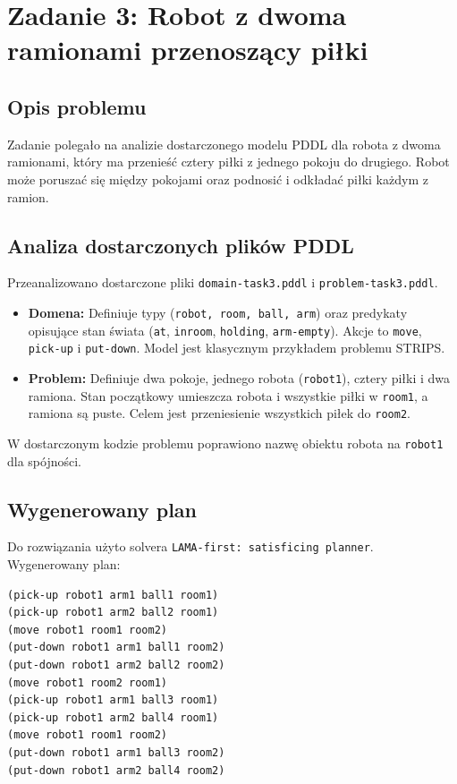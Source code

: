 \documentclass[11pt,a4paper]{article}
\begin{document}
\section{Zadanie 3: Robot z dwoma ramionami przenoszący piłki}
\subsection{Opis problemu}
Zadanie polegało na analizie dostarczonego modelu PDDL dla robota z dwoma ramionami, który ma przenieść cztery piłki z jednego pokoju do drugiego. Robot może poruszać się między pokojami oraz podnosić i odkładać piłki każdym z ramion.

\subsection{Analiza dostarczonych plików PDDL}
Przeanalizowano dostarczone pliki \texttt{domain-task3.pddl} i \texttt{problem-task3.pddl}.
\begin{itemize}
  \item \textbf{Domena:} Definiuje typy (\texttt{robot, room, ball, arm}) oraz predykaty opisujące stan świata (\texttt{at}, \texttt{inroom}, \texttt{holding}, \texttt{arm-empty}). Akcje to \texttt{move}, \texttt{pick-up} i \texttt{put-down}. Model jest klasycznym przykładem problemu STRIPS.
  \item \textbf{Problem:} Definiuje dwa pokoje, jednego robota (\texttt{robot1}), cztery piłki i dwa ramiona. Stan początkowy umieszcza robota i wszystkie piłki w \texttt{room1}, a ramiona są puste. Celem jest przeniesienie wszystkich piłek do \texttt{room2}.
\end{itemize}
W dostarczonym kodzie problemu poprawiono nazwę obiektu robota na \texttt{robot1} dla spójności.

\subsection{Wygenerowany plan}
Do rozwiązania użyto solvera \texttt{LAMA-first: satisficing planner}. Wygenerowany plan:
\begin{lstlisting}[caption=Wygenerowany plan dla Zadania 3, label=lst:plan_task3]
(pick-up robot1 arm1 ball1 room1)
(pick-up robot1 arm2 ball2 room1)
(move robot1 room1 room2)
(put-down robot1 arm1 ball1 room2)
(put-down robot1 arm2 ball2 room2)
(move robot1 room2 room1)
(pick-up robot1 arm1 ball3 room1)
(pick-up robot1 arm2 ball4 room1)
(move robot1 room1 room2)
(put-down robot1 arm1 ball3 room2)
(put-down robot1 arm2 ball4 room2)
\end{lstlisting}
\end{document}
